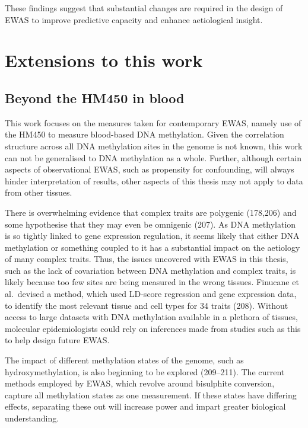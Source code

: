 \documentclass[11pt,oneside]{bristolthesis}
\begin{document}
These findings suggest that substantial changes are required in the design of EWAS to improve predictive capacity and enhance aetiological insight.

\hypertarget{extensions-to-work}{%
\section{Extensions to this work}\label{extensions-to-work}}

\hypertarget{beyond-the-hm450}{%
\subsection{Beyond the HM450 in blood}\label{beyond-the-hm450}}

This work focuses on the measures taken for contemporary EWAS, namely use of the HM450 to measure blood-based DNA methylation. Given the correlation structure across all DNA methylation sites in the genome is not known, this work can not be generalised to DNA methylation as a whole. Further, although certain aspects of observational EWAS, such as propensity for confounding, will always hinder interpretation of results, other aspects of this thesis may not apply to data from other tissues.

There is overwhelming evidence that complex traits are polygenic (178,206) and some hypothesise that they may even be omnigenic (207). As DNA methylation is so tightly linked to gene expression regulation, it seems likely that either DNA methylation or something coupled to it has a substantial impact on the aetiology of many complex traits. Thus, the issues uncovered with EWAS in this thesis, such as the lack of covariation between DNA methylation and complex traits, is likely because too few sites are being measured in the wrong tissues. Finucane et al.~devised a method, which used LD-score regression and gene expression data, to identify the most relevant tissue and cell types for 34 traits (208). Without access to large datasets with DNA methylation available in a plethora of tissues, molecular epidemiologists could rely on inferences made from studies such as this to help design future EWAS.

The impact of different methylation states of the genome, such as hydroxymethylation, is also beginning to be explored (209--211). The current methods employed by EWAS, which revolve around bisulphite conversion, capture all methylation states as one measurement. If these states have differing effects, separating these out will increase power and impart greater biological understanding.
\end{document}
